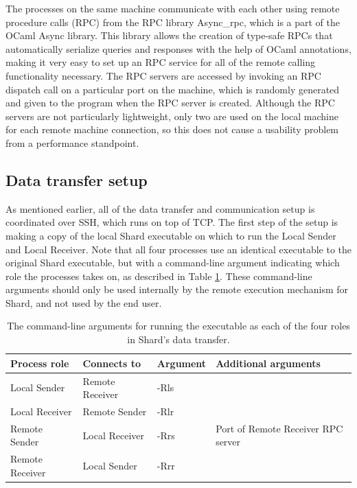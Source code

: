 \documentclass[oneside]{report}
\begin{document}
The processes on the same machine communicate with each other using remote procedure calls (RPC) from the RPC library Async\_rpc, which is a part of the OCaml Async library.
This library allows the creation of type-safe RPCs that automatically serialize queries and responses with the help of OCaml annotations, making it very easy to set up an RPC service for all of the remote calling functionality necessary.
The RPC servers are accessed by invoking an RPC dispatch call on a particular port on the machine, which is randomly generated and given to the program when the RPC server is created.
Although the RPC servers are not particularly lightweight, only two are used on the local machine for each remote machine connection, so this does not cause a usability problem from a performance standpoint.

\subsection{Data transfer setup}

As mentioned earlier, all of the data transfer and communication setup is coordinated over SSH, which runs on top of TCP.
The first step of the setup is making a copy of the local Shard executable on which to run the Local Sender and Local Receiver.
Note that all four processes use an identical executable to the original Shard executable, but with a command-line argument indicating which role the processes takes on, as described in Table \ref{fig:process_role_args}.
These command-line arguments should only be used internally by the remote execution mechanism for Shard, and not used by the end user.

\begin{table}[h]
  \begin{center}
    \begin{tabular}{|l|l|l|l|}
      \hline
      Process role    & Connects to     & Argument & Additional arguments               \\ \hline
      Local Sender    & Remote Receiver & -Rls     &                                    \\ \hline
      Local Receiver  & Remote Sender   & -Rlr     &                                    \\ \hline
      Remote Sender   & Local Receiver  & -Rrs     & Port of Remote Receiver RPC server \\ \hline
      Remote Receiver & Local Sender    & -Rrr     &                                    \\ \hline
    \end{tabular}
    \caption{The command-line arguments for running the executable as each of the four roles in Shard's data transfer.}
    \label{fig:process_role_args}
  \end{center}
\end{table}
\end{document}
